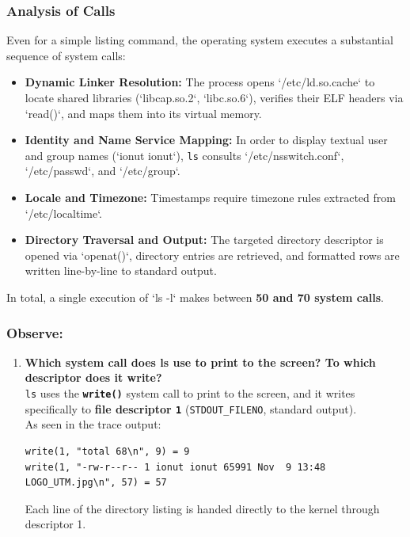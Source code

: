 \documentclass{labreport}
\begin{document}
\subsubsection{Analysis of Calls}
Even for a simple listing command, the operating system executes a substantial sequence of system calls:
\begin{itemize}[noitemsep]
    \item \textbf{Dynamic Linker Resolution:} The process opens `/etc/ld.so.cache` to locate shared libraries (`libcap.so.2`, `libc.so.6`), verifies their ELF headers via `read()`, and maps them into its virtual memory.
    \item \textbf{Identity and Name Service Mapping:} In order to display textual user and group names (`ionut ionut`), \texttt{ls} consults `/etc/nsswitch.conf`, `/etc/passwd`, and `/etc/group`.
    \item \textbf{Locale and Timezone:} Timestamps require timezone rules extracted from `/etc/localtime`.
    \item \textbf{Directory Traversal and Output:} The targeted directory descriptor is opened via `openat()`, directory entries are retrieved, and formatted rows are written line-by-line to standard output.
\end{itemize}
In total, a single execution of `ls -l` makes between \textbf{50 and 70 system calls}.

\subsubsection*{Observe:}
\begin{enumerate}[leftmargin=*]
    \item \textbf{Which system call does ls use to print to the screen? To which descriptor does it write?}\\[0.2em]
    \texttt{ls} uses the \textbf{\texttt{write()}} system call to print to the screen, and it writes specifically to \textbf{file descriptor \texttt{1}} (\texttt{STDOUT\_FILENO}, standard output).\\
    As seen in the trace output:
    \begin{lstlisting}[style=bash]
write(1, "total 68\n", 9) = 9
write(1, "-rw-r--r-- 1 ionut ionut 65991 Nov  9 13:48 LOGO_UTM.jpg\n", 57) = 57
    \end{lstlisting}
    Each line of the directory listing is handed directly to the kernel through descriptor 1.
\end{enumerate}
\end{document}
